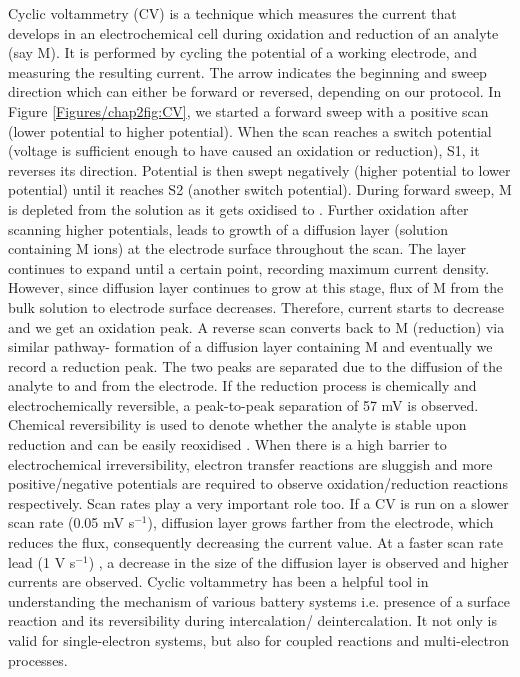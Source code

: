 Cyclic voltammetry (CV) is a technique which measures the current that develops in an electrochemical cell during oxidation and reduction of an analyte (say M). It is performed by cycling the potential of a working electrode, and measuring the resulting current. The arrow indicates the beginning and sweep direction which can either be forward or reversed, depending on our protocol. In Figure \ref{Figures/chap2fig:CV}, we started a forward sweep with a positive scan (lower potential to higher potential). When the scan reaches a switch potential (voltage is sufficient enough to have caused an oxidation or reduction), S1, it reverses its direction. Potential is then swept negatively (higher potential to lower potential) until it reaches S2 (another switch potential). During forward sweep, M is depleted from the solution as it gets oxidised to . Further oxidation after scanning higher potentials, leads to growth of a diffusion layer (solution containing M ions) at the electrode surface throughout the scan. The layer continues to expand until a certain point, recording maximum current density. However, since diffusion layer continues to grow at this stage, flux of M from the bulk solution to electrode surface decreases. Therefore, current starts to decrease and we get an oxidation peak. A reverse scan converts  back to M (reduction) via similar pathway- formation of a diffusion layer containing M and eventually we record a reduction peak. The two peaks are separated due to the diffusion of the analyte to and from the electrode. If the reduction process is chemically and electrochemically reversible, a peak-to-peak separation of 57 mV is observed. Chemical reversibility is used to denote whether the analyte is stable upon reduction and can be easily reoxidised \cite{bard_electrochemical_1980}. When there is a high barrier to electrochemical irreversibility, electron transfer reactions are sluggish and more positive/negative potentials are required to observe oxidation/reduction reactions respectively. Scan rates play a very important role too. If a CV is run on a slower scan rate (0.05 mV s$^{-1}$), diffusion layer grows farther from the electrode, which reduces the flux, consequently decreasing the current value. At a faster scan rate lead (1 V s$^{-1}$) , a decrease in the size of the diffusion layer is observed and higher currents are observed. Cyclic voltammetry has been a helpful tool in understanding the mechanism of various battery systems i.e. presence of a surface reaction and its reversibility during intercalation/ deintercalation. It not only is valid for single-electron systems, but also for coupled reactions and multi-electron processes.  

